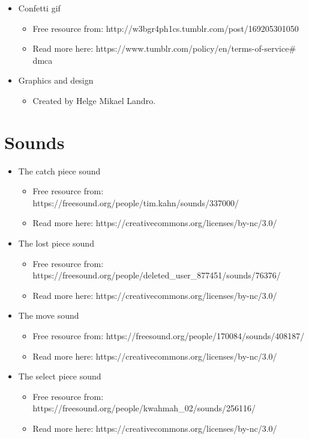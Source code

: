 \documentclass{article}
\begin{document}
\begin{itemize}
\item Confetti gif
    \begin{itemize}
        \item Free resource from: http://w3bgr4ph1cs.tumblr.com/post/169205301050
        \item Read more here: https://www.tumblr.com/policy/en/terms-of-service\# dmca
        \end{itemize}
\end{itemize}


\begin{itemize}
\item Graphics and design
    \begin{itemize}
        \item Created by Helge Mikael Landro.
        \end{itemize}
\end{itemize}

\section*{Sounds}
\begin{itemize}
\item The catch piece sound
    \begin{itemize}
        \item Free resource from:  https://freesound.org/people/tim.kahn/sounds/337000/
        \item Read more here: https://creativecommons.org/licenses/by-nc/3.0/
        \end{itemize}
\end{itemize}

\begin{itemize}
\item The lost piece sound
    \begin{itemize}
        \item Free resource from: https://freesound.org/people/deleted\_user\_877451/sounds/76376/
        \item Read more here: https://creativecommons.org/licenses/by-nc/3.0/
        \end{itemize}
\end{itemize}

\begin{itemize}
\item The move sound
    \begin{itemize}
        \item Free resource from:  https://freesound.org/people/170084/sounds/408187/
        \item Read more here: https://creativecommons.org/licenses/by-nc/3.0/
        \end{itemize}
\end{itemize}

\begin{itemize}
\item The select piece sound
    \begin{itemize}
        \item Free resource from: https://freesound.org/people/kwahmah\_02/sounds/256116/
        \item Read more here: https://creativecommons.org/licenses/by-nc/3.0/
        \end{itemize}
\end{itemize}
\end{document}
